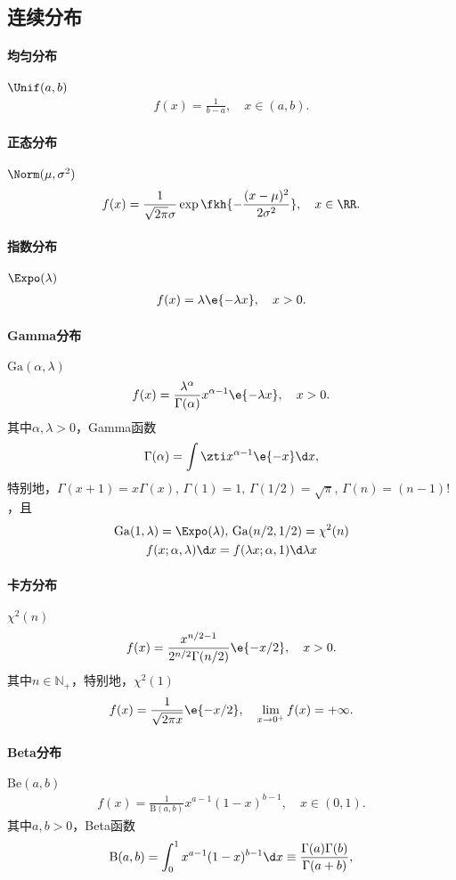 \subsection{连续分布}
\paragraph{均匀分布}$\Unif(a,b)$
\begin{align}
	f(x)=\frac1{b-a},\quad x\in(a,b).
\end{align}
\paragraph{正态分布}$\Norm(\mu,\sigma^2)$
\begin{align}
	f(x)=\frac1{\sqrt{2\pi}\sigma}\exp\fkh{-\frac{(x-\mu)^2}{2\sigma^2}},\quad x\in\RR.
\end{align}
\paragraph{指数分布}$\Expo(\lambda)$
\begin{align}
	f(x)=\lambda\e{-\lambda x},\quad x>0.
\end{align}
\paragraph{Gamma分布}$\mathrm{Ga}(\alpha,\lambda)$
\begin{align}
	f(x)=\frac{\lambda^\alpha}{\Gamma(\alpha)}x^{\alpha-1}\e{-\lambda x},\quad x>0.
\end{align}
其中$\alpha,\lambda>0$，Gamma函数
\[
	\Gamma(\alpha)=\int\zti x^{\alpha-1}\e{-x}\d x,
\]
特别地，$\Gamma(x+1)=x\Gamma(x),\,\Gamma(1)=1,\,\Gamma(1/2)=\sqrt\pi,\,\Gamma(n)=(n-1)!$，且
\begin{gather*}
	\mathrm{Ga}(1,\lambda)=\Expo(\lambda),\,\mathrm{Ga}(n/2,1/2)=\chi^2(n)\\
	f(x;\alpha,\lambda)\d x=f(\lambda x;\alpha,1)\d\lambda x
\end{gather*}
\paragraph{卡方分布}$\chi^2(n)$
\begin{align}
	f(x)=\frac{x^{n/2-1}}{2^{n/2}\Gamma(n/2)}\e{-x/2},\quad x>0.
\end{align}
其中$n\in\mathbb N_+$，特别地，$\chi^2(1)$
\[
	f(x)=\frac1{\sqrt{2\pi x}}\e{-x/2},\quad\lim_{x\to 0^+}f(x)=+\infty.
\]
\paragraph{Beta分布}$\mathrm{Be}(a,b)$
\begin{align}
	f(x)=\frac1{\mathrm B(a,b)}x^{a-1}(1-x)^{b-1},\quad x\in(0,1).
\end{align}
其中$a,b>0$，Beta函数
\[
	\mathrm B(a,b)=\int_0^1x^{a-1}(1-x)^{b-1}\d x\equiv\frac{\Gamma(a)\Gamma(b)}{\Gamma(a+b)},
\]
